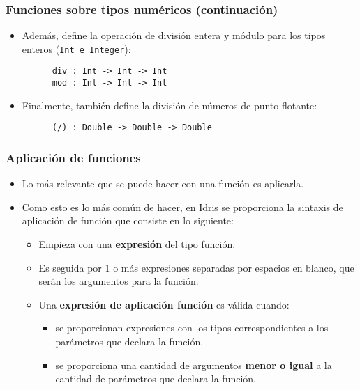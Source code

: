 \documentclass{beamer}
\begin{document}
\begin{frame}[fragile]
  \frametitle{Funciones sobre tipos numéricos (continuación)}

  \begin{itemize}
    \item Además, define la operación de división entera y módulo para los tipos
      enteros (\texttt{Int e Integer}):
      \vspace{4pt}
      \begin{verbatim}
      div : Int -> Int -> Int
      mod : Int -> Int -> Int
      \end{verbatim}
    \item Finalmente, también define la división de números de punto flotante:
      \vspace{4pt}
      \begin{verbatim}
      (/) : Double -> Double -> Double
      \end{verbatim}
  \end{itemize}
\end{frame}

\begin{frame}[fragile]
  \frametitle{Aplicación de funciones}

  \begin{itemize}
    \item Lo más relevante que se puede hacer con una función es aplicarla.
    \item Como esto es lo más común de hacer, en Idris se proporciona la sintaxis de
      aplicación de función que consiste en lo siguiente:
      \begin{itemize}
        \item Empieza con una \textbf{expresión} del tipo función.
        \item Es seguida por 1 o más expresiones separadas por espacios
          en blanco, que serán los argumentos para la función.
        \item Una \textbf{expresión de aplicación función} es válida cuando:
          \begin{itemize}
            \item se proporcionan expresiones con los tipos correspondientes a los
              parámetros que declara la función.
            \item se proporciona una cantidad de argumentos \textbf{menor o igual}
              a la cantidad de parámetros que declara la función.
          \end{itemize}
      \end{itemize}
  \end{itemize}
\end{frame}
\end{document}
